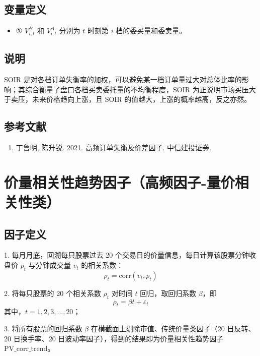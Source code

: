 \documentclass{article}
\begin{document}
\subsection{变量定义}
\begin{itemize}
    \item ① \( V_{i,t}^B \) 和 \( V_{i,t}^A \) 分别为 \( t \) 时刻第 \( i \) 档的委买量和委卖量。
\end{itemize}

\subsection{说明}
SOIR 是对各档订单失衡率的加权，可以避免某一档订单量过大对总体比率的影响；其综合衡量了盘口各档买卖委托量的不均衡程度，SOIR 为正说明市场买压大于卖压，未来价格趋向上涨，且 SOIR 的值越大，上涨的概率越高，反之亦然。

\subsection{参考文献}
\begin{enumerate}
    \item 丁鲁明, 陈升锐. 2021. 高频订单失衡及价差因子. 中信建投证券.
\end{enumerate}

\section{价量相关性趋势因子（高频因子-量价相关性类）}

\subsection{因子定义}

1. 每月月底，回溯每只股票过去 20 个交易日的价量信息，每日计算该股票分钟收盘价 \( p_t \) 与分钟成交量 \( v_t \) 的相关系数：
\begin{equation}
    \rho_t = \mathrm{corr}(v_t, p_t)
\end{equation}

2. 将每只股票的 20 个相关系数 \( \rho_t \) 对时间 \( t \) 回归，取回归系数 \( \beta \)，即
\begin{equation}
    \rho_t = \beta t + \varepsilon_t
\end{equation}
其中，\( t = 1, 2, 3, \ldots, 20 \)；

3. 将所有股票的回归系数 \( \beta \) 在横截面上剔除市值、传统价量类因子（20 日反转、20 日换手率、20 日波动率因子），得到的结果即为价量相关性趋势因子 \( \mathrm{PV\_corr\_trend} \)。
\end{document}
